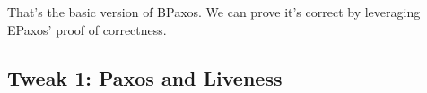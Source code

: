 \documentclass{mwhittaker}
\begin{document}
That's the basic version of BPaxos. We can prove it's correct by leveraging
EPaxos' proof of correctness.

\subsection{Tweak 1: Paxos and Liveness}





\end{document}
